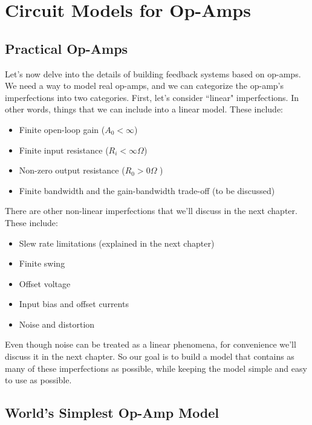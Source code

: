 \section{Circuit Models for Op-Amps}



\subsection{Practical Op-Amps}

Let's now delve into the details of building feedback systems based on op-amps.  We need a way to model real op-amps, and we can categorize the op-amp's imperfections into two categories.  First, let's consider ``linear" imperfections. In other words, things that we can include into a linear model.  These include:

\begin{itemize}
	\item  Finite open-loop gain ($A_0 < \infty$)
	\item  Finite input resistance ($R_i < \infty\Omega$)
 	\item Non-zero output resistance ($R_0 > 0\Omega$ )
 	\item Finite bandwidth and the gain-bandwidth trade-off (to be discussed) 
\end{itemize}
% 
There are other non-linear imperfections that we'll discuss in the next chapter.  These include:
%
\begin{itemize}
\item Slew rate limitations (explained in the next chapter)
\item Finite swing
\item Offset voltage
\item Input bias and offset currents
\item Noise and distortion
\end{itemize}
 
Even though noise can be treated as a linear phenomena, for convenience we'll discuss it in the next chapter.  So our goal is to build a model that contains as many of these imperfections as possible, while keeping the model simple and easy to use as possible.



\subsection{World's Simplest Op-Amp Model}

